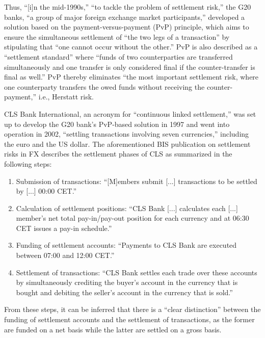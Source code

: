 Thus, ``[i]n the mid-1990s,'' ``to tackle the problem of settlement risk,'' the G20 banks, ``a group of major foreign exchange market participants,'' developed a solution based on the payment-versus-payment (PvP) principle, which aims to ensure the simultaneous settlement of ``the two legs of a transaction'' by stipulating that ``one cannot occur without the other.'' \autocite[60]{galati2002}
PvP is also described as a ``settlement standard'' where ``funds of two counterparties are transferred simultaneously and one transfer is only considered final if the counter-transfer is final as well.'' \autocite[6]{uzh2007cls}
PvP thereby eliminates ``the most important settlement risk, where one counterparty transfers the owed funds without receiving the counter-payment,'' i.e., Herstatt risk. \autocite[6]{uzh2007cls}

CLS Bank International, an acronym for ``continuous linked settlement,'' was set up to develop the G20 bank's PvP-based solution in 1997 and went into operation in 2002, ``settling transactions involving seven currencies,'' including the euro and the US dollar. \autocite[60, 61]{galati2002}
The aforementioned BIS publication on settlement risks in FX describes the settlement phases of CLS as summarized in the following steps: \autocite[61, 62]{galati2002}

\begin{enumerate}
	\item
		Submission of transactions: ``[M]embers submit [...] transactions to be settled by [...] 00:00 CET.''
	\item
		Calculation of settlement positions: ``CLS Bank [...] calculates each [...] member's net total pay-in/pay-out position for each currency and at 06:30 CET issues a pay-in schedule.''
	\item
		Funding of settlement accounts: ``Payments to CLS Bank are executed between 07:00 and 12:00 CET.''
	\item
		Settlement of transactions: ``CLS Bank settles each trade over these accounts by simultaneously crediting the buyer’s account in the currency that is bought and debiting the seller’s account in the currency that is sold.''
\end{enumerate}

From these steps, it can be inferred that there is a ``clear distinction'' between the funding of settlement accounts and the settlement of transactions, as the former are funded on a net basis while the latter are settled on a gross basis. \autocite[62]{galati2002}

